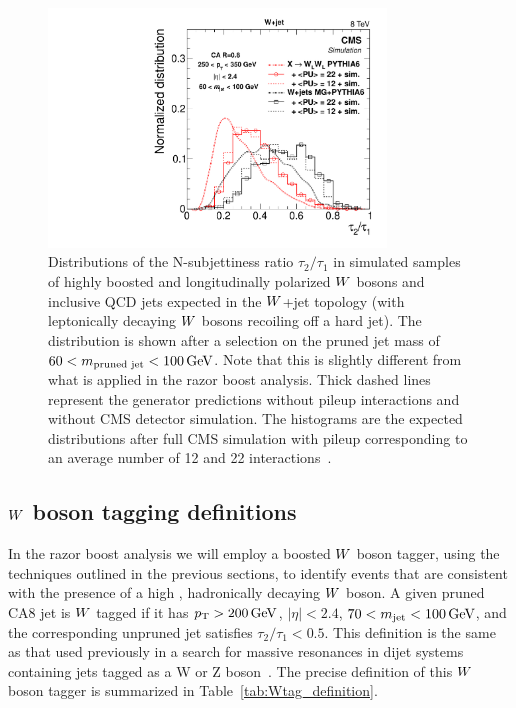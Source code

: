 \begin{figure}[htb]
  \centering
  \includegraphics[width=0.8\textwidth]{figures/razor_wtag/tau2tau1_afterMass}
  \caption{Distributions of the N-subjettiness ratio $\tau_2 / \tau_1$ in simulated samples of
highly boosted and longitudinally polarized $W$ bosons and inclusive QCD jets expected in the
$W$+jet topology (\ie with leptonically decaying $W$ bosons recoiling off a hard jet). 
The distribution is shown after a selection on the pruned jet mass of $60 < m_{\textrm{pruned jet}}
< 100 \,\text{Ge\hspace{-.08em}V}$. Note that this is slightly different from what is applied in the razor boost analysis.
Thick dashed lines represent the generator predictions without pileup interactions and without CMS
detector simulation. The histograms are the expected distributions after full CMS simulation with
pileup corresponding to an average number of 12 and 22 interactions~\cite{Khachatryan:2014vla}. 
  \label{fig:boost_wtag_tau2tau1}}
\end{figure}



\subsection{\texorpdfstring{$W$}{W} boson tagging definitions}

In the razor boost analysis we will employ a boosted $W$ boson tagger, using the techniques
outlined in the previous sections, to identify events that are consistent with the presence of a
high \pt, hadronically decaying $W$ boson. 
A given pruned CA8 jet is $W$ tagged if it has $p_{\mathrm{T}} > 200\,\text{Ge\hspace{-.08em}V}$, $|\eta|<2.4$, $70 < m_\textrm{jet}
< 100\,\text{Ge\hspace{-.08em}V}$, and the corresponding unpruned jet satisfies $\tau_2 / \tau_1 < 0.5$.
This definition is the same as that used previously in a search for massive resonances in dijet
systems containing jets tagged as a W or Z boson~\cite{EXO-12-024,EXO-13-009}. 
The precise definition of this $W$ boson tagger is summarized in Table~\ref{tab:Wtag_definition}.

